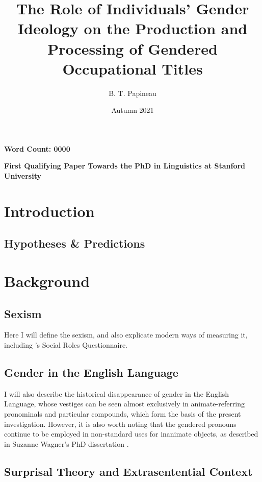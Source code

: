 \documentclass{article}
\title{The Role of Individuals' Gender Ideology on the Production and Processing of Gendered Occupational Titles}
\date{Autumn 2021}
\author{B. T. Papineau}
\begin{document}
	\maketitle
	
	\begin{center}
		\textbf{Word Count: 0000}
		\vspace{0.5cm}
		
		\textbf{First Qualifying Paper Towards the PhD in Linguistics at Stanford University}
	\end{center}
	\newpage
	
	\tableofcontents
	
	\newpage
	
	\section{Introduction}
	
	\subsection{Hypotheses \& Predictions}
	
	\newpage
	\section{Background}
	
	\subsection{Sexism}
	Here I will define the sexism, and also explicate modern ways of measuring it, including \textcite{baber2006social}'s Social Roles Questionnaire.
	
	\subsection{Gender in the English Language}
	
	I will also describe the historical disappearance of gender in the English Language, whose vestiges can be seen almost exclusively in animate-referring pronominals and particular compounds, which form the basis of the present investigation. However, it is also worth noting that the gendered pronouns continue to be employed in non-standard uses for inanimate objects, as described in Suzanne Wagner's PhD dissertation \parencite{wagner2003gender}.
	
	\subsection{Surprisal Theory and Extrasentential Context}
	
\end{document}
